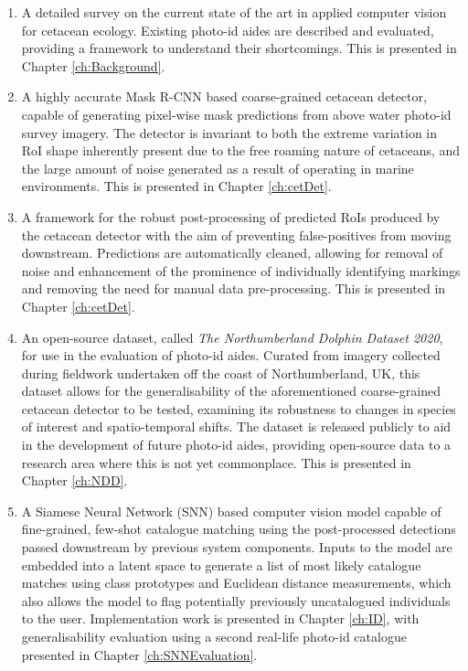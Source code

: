 \begin{enumerate}
	\item A detailed survey on the current state of the art in applied computer vision for cetacean ecology. Existing photo-id aides are described and evaluated, providing a framework to understand their shortcomings. This is presented in Chapter \ref{ch:Background}. 
	\item A highly accurate Mask R-CNN \cite{he_mask_2017} based coarse-grained cetacean detector, capable of generating pixel-wise mask predictions from above water photo-id survey imagery. The detector is invariant to both the extreme variation in RoI shape inherently present due to the free roaming nature of cetaceans, and the large amount of noise generated as a result of operating in marine environments.  This is presented in Chapter \ref{ch:cetDet}.
	\item A framework for the robust post-processing of predicted RoIs produced by the cetacean detector with the aim of preventing false-positives from moving downstream. Predictions are automatically cleaned, allowing for removal of noise and enhancement of the prominence of individually identifying markings and removing the need for manual data pre-processing. This is presented in Chapter \ref{ch:cetDet}.
	\item An open-source dataset, called \textit{The Northumberland Dolphin Dataset 2020}, for use in the evaluation of photo-id aides. Curated from imagery collected during fieldwork undertaken off the coast of Northumberland, UK, this dataset allows for the generalisability of the aforementioned coarse-grained cetacean detector to be tested, examining its robustness to changes in species of interest and spatio-temporal shifts. The dataset is released publicly to aid in the development of future photo-id aides, providing open-source data to a research area where this is not yet commonplace. This is presented in Chapter \ref{ch:NDD}.
	\item A Siamese Neural Network (SNN) based computer vision model capable of fine-grained, few-shot catalogue matching using the post-processed detections passed downstream by previous system components. Inputs to the model are embedded into a latent space to generate a list of most likely catalogue matches using class prototypes and Euclidean distance measurements, which also allows the model to flag potentially previously uncatalogued individuals to the user. Implementation work is presented in Chapter \ref{ch:ID}, with generalisability evaluation using a second real-life photo-id catalogue presented in Chapter \ref{ch:SNNEvaluation}.
\end{enumerate}

